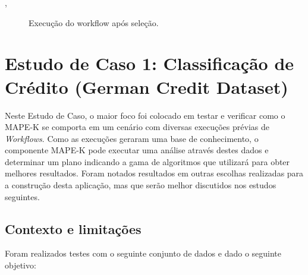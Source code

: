 \documentclass[portugues]{ic-tese}
\begin{document}
,
\begin{figure}[H]
    \centering
    \caption{Execução do workflow após seleção.}
    \label{fig:pipelineAutonomoResultado}
\end{figure}

\chapter{Estudo de Caso 1: Classificação de Crédito (German Credit Dataset)}

Neste Estudo de Caso, o maior foco foi colocado em testar e verificar como o MAPE-K se comporta em um cenário com diversas execuções prévias de \textit{Workflows}. Como as execuções geraram uma base de conhecimento, o componente MAPE-K pode executar uma análise através destes dados e determinar um plano indicando a gama de algoritmos que utilizará para obter melhores resultados. Foram notados resultados em outras escolhas realizadas para a construção desta aplicação, mas que serão melhor discutidos nos estudos seguintes.

\section{Contexto e limitações}

Foram realizados testes com o seguinte conjunto de dados e dado o seguinte objetivo:
\end{document}
